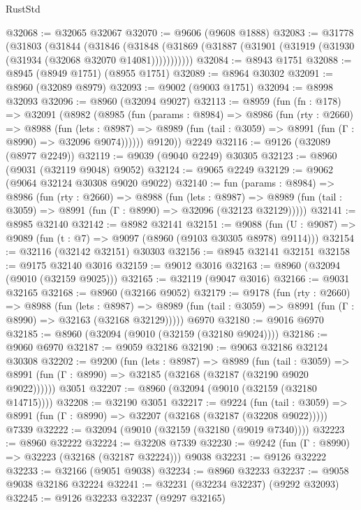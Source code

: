 \begin{lexlean}{RustStd}
\begin{coremodule}
@32068 := @32065 @32067
@32070 := @9606 (@9608 @1888)
@32083 := @31778
    (@31803
      (@31844
        (@31846
          (@31848 (@31869 (@31887 (@31901 (@31919 (@31930 (@31934 (@32068 @32070 @14081)))))))))))
@32084 := @8943 @1751
@32088 := @8945 (@8949 @1751) (@8955 @1751)
@32089 := @8964 @30302
@32091 := @8960 (@32089 @8979)
@32093 := @9002 (@9003 @1751)
@32094 := @8998 @32093
@32096 := @8960 (@32094 @9027)
@32113 := @8959
    (fun (fn : @178) =>
    @32091
      (@8982
        (@8985
          (fun (params : @8984) =>
          @8986
            (fun (rty : @2660) =>
            @8988
              (fun (lets : @8987) =>
              @8989 (fun (tail : @3059) => @8991 (fun (Γ : @8990) => @32096 @9074))))))
        @9120))
    @2249
@32116 := @9126 (@32089 (@8977 @2249))
@32119 := @9039 (@9040 @2249) @30305
@32123 := @8960 (@9031 (@32119 @9048) @9052)
@32124 := @9065 @2249
@32129 := @9062 (@9064 @32124 @30308 @9020 @9022)
@32140 := fun (params : @8984) =>
  @8986
    (fun (rty : @2660) =>
    @8988
      (fun (lets : @8987) =>
      @8989 (fun (tail : @3059) => @8991 (fun (Γ : @8990) => @32096 (@32123 @32129)))))
@32141 := @8985 @32140
@32142 := @8982 @32141
@32151 := @9088
    (fun (U : @9087) => @9089 (fun (t : @7) => @9097 (@8960 (@9103 @30305 @8978) @9114)))
@32154 := @32116 (@32142 @32151) @30303
@32156 := @8945 @32141 @32151
@32158 := @9175 @32140 @3016
@32159 := @9012 @3016
@32163 := @8960 (@32094 (@9010 (@32159 @9025)))
@32165 := @32119 (@9047 @3016)
@32166 := @9031 @32165
@32168 := @8960 (@32166 @9052)
@32179 := @9178
    (fun (rty : @2660) =>
    @8988
      (fun (lets : @8987) =>
      @8989 (fun (tail : @3059) => @8991 (fun (Γ : @8990) => @32163 (@32168 @32129)))))
    @6970
@32180 := @9016 @6970
@32185 := @8960 (@32094 (@9010 (@32159 (@32180 @9024))))
@32186 := @9060 @6970
@32187 := @9059 @32186
@32190 := @9063 @32186 @32124 @30308
@32202 := @9200
    (fun (lets : @8987) =>
    @8989
      (fun (tail : @3059) =>
      @8991 (fun (Γ : @8990) => @32185 (@32168 (@32187 (@32190 @9020 @9022))))))
    @3051
@32207 := @8960 (@32094 (@9010 (@32159 (@32180 @14715))))
@32208 := @32190 @3051
@32217 := @9224
    (fun (tail : @3059) => @8991 (fun (Γ : @8990) => @32207 (@32168 (@32187 (@32208 @9022)))))
    @7339
@32222 := @32094 (@9010 (@32159 (@32180 (@9019 @7340))))
@32223 := @8960 @32222
@32224 := @32208 @7339
@32230 := @9242 (fun (Γ : @8990) => @32223 (@32168 (@32187 @32224))) @9038
@32231 := @9126 @32222
@32233 := @32166 (@9051 @9038)
@32234 := @8960 @32233
@32237 := @9058 @9038 @32186 @32224
@32241 := @32231 (@32234 @32237) (@9292 @32093)
@32245 := @9126 @32233 @32237 (@9297 @32165)

\end{coremodule}
\end{lexlean}
